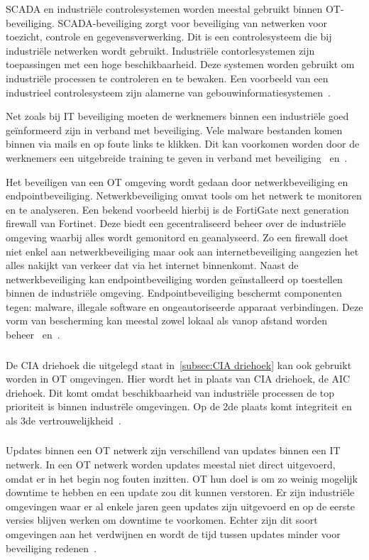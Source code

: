 SCADA en industriële controlesystemen worden meestal gebruikt binnen OT-beveiliging. SCADA-beveiliging zorgt voor beveiliging van netwerken voor toezicht, controle en gegevensverwerking. Dit is een controlesysteem die bij industriële netwerken wordt gebruikt. Industriële contorlesystemen zijn toepassingen met een hoge beschikbaarheid. Deze systemen worden gebruikt om industriële processen te controleren en te bewaken. Een voorbeeld van een industrieel controlesysteem zijn alamerne van gebouwinformatiesystemen~\autocite{Infradata2019}.


Net zoals bij IT beveiliging moeten de werknemers binnen een industriële goed geïnformeerd zijn in verband met beveiliging. Vele malware bestanden komen binnen via mails en op foute links te klikken. Dit kan voorkomen worden door de werknemers een uitgebreide training te geven in verband met beveiliging~\autocite{Infradata2019} en~\autocite{Security2020}.

Het beveiligen van een OT omgeving wordt gedaan door netwerkbeveiliging en endpointbeveiliging. Netwerkbeveiliging omvat tools om het netwerk te monitoren en te analyseren. Een bekend voorbeeld hierbij is de FortiGate next generation firewall van Fortinet. Deze biedt een gecentraliseerd beheer over de industriële omgeving waarbij alles wordt gemonitord en geanalyseerd. Zo een firewall doet niet enkel aan netwerkbeveiliging maar ook aan internetbeveiliging aangezien het alles nakijkt van verkeer dat via het internet binnenkomt. Naast de netwerkbeveiliging kan endpointbeveiliging worden geïnstalleerd op toestellen binnen de industriële omgeving. Endpointbeveiliging beschermt componenten tegen: malware, illegale software en ongeautoriseerde apparaat verbindingen. Deze vorm van bescherming kan meestal zowel lokaal als vanop afstand worden beheer~\autocite{Infradata2019} en~\autocite{Security2020}.

\subsubsection{}
\label{subsec:AIC driehoek}
De CIA driehoek die uitgelegd staat in~\ref{subsec:CIA driehoek} kan ook gebruikt worden in OT omgevingen. Hier wordt het in plaats van CIA driehoek, de AIC driehoek. Dit komt omdat beschikbaarheid van industriële processen de top prioriteit is binnen industrële omgevingen. Op de 2de plaats komt integriteit en als 3de vertrouwelijkheid~\autocite{Max2020}.   
\subsubsection{}
\label{subsec:Updates OT}
Updates binnen een OT netwerk zijn verschillend van updates binnen een IT netwerk. In een OT netwerk worden updates meestal niet direct uitgevoerd, omdat er in het begin nog fouten inzitten. OT hun doel is om zo weinig mogelijk downtime te hebben en een update zou dit kunnen verstoren. Er zijn industriële omgevingen waar er al enkele jaren geen updates zijn uitgevoerd en op de eerste versies blijven werken om downtime te voorkomen. Echter zijn dit soort omgevingen aan het verdwijnen en wordt de tijd tussen updates minder voor beveiliging redenen~\autocite{Max2020}.
